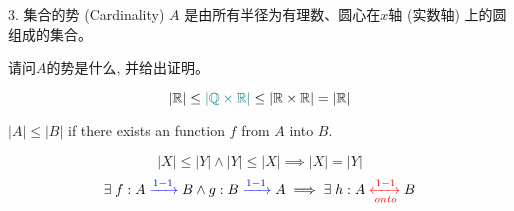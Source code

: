 \begin{frame}{}
  \begin{exampleblock}{$3.$ 集合的势 (Cardinality)}
    $A$ 是由所有半径为有理数、圆心在$x$轴 (实数轴) 上的圆组成的集合。

    请问$A$的势是什么, 并给出证明。
  \end{exampleblock}

  \pause
  \vspace{0.30cm}
  \[
    |\mathbb{R}| \le \textcolor{teal}{|\mathbb{Q} \times \mathbb{R}|} \le |\mathbb{R} \times \mathbb{R}| = |\mathbb{R}|
  \]
\end{frame}

\begin{frame}{}
  \begin{definition}[$|A| \le |B|$]
    $|A| \le |B|$ if there exists an  function $f$ from $A$ into $B$.
  \end{definition}

  \pause
  \vspace{0.50cm}
  \centerline{\large {}}

  \pause
  \vspace{0.30cm}
  \begin{theorem}
    \[
      |X| \le |Y| \land |Y| \le |X| \implies |X| = |Y|
    \]
    \pause
    \[
      \exists\; f: A \textcolor{blue}{\;\xrightarrow{1-1}\;} B \land g: B \textcolor{blue}{\;\xrightarrow{1-1}\;} A \implies \exists\; h: A \textcolor{red}{\;\xleftrightarrow[onto]{1-1}\;} B
    \]
  \end{theorem}
\end{frame}

